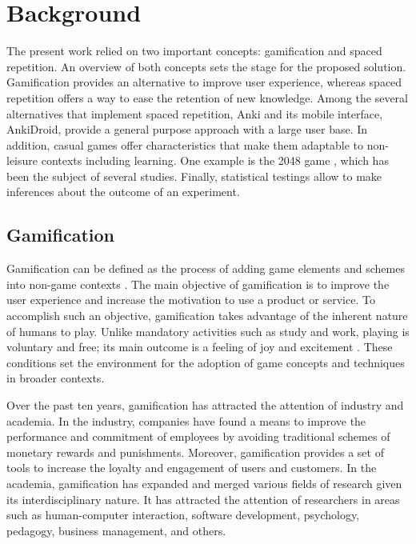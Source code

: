 
\chapter{Background} %

\label{back} %

The present work relied on two important concepts: gamification and spaced repetition. An overview of both concepts sets the stage for the proposed solution. Gamification provides an alternative to improve user experience, whereas spaced repetition offers a way to ease the retention of new knowledge. Among the several alternatives that implement spaced repetition, Anki and its mobile interface, AnkiDroid, provide a general purpose approach with a large user base. In addition, casual games offer characteristics that make them adaptable to non-leisure contexts including learning. One example is the 2048 game \citep{uberspot2017game}, which has been the subject of several studies. Finally, statistical testings allow to make inferences about the outcome of an experiment.

\section{Gamification}
Gamification can be defined as the process of adding game elements and schemes into non-game contexts \citep{deterding2011game}. The main objective of gamification is to improve the user experience and increase the motivation to use a product or service. To accomplish such an objective, gamification takes advantage of the inherent nature of humans to play. Unlike mandatory activities such as study and work, playing is voluntary and free; its main outcome is a feeling of joy and excitement \citep{johan1950homo}. These conditions set the environment for the adoption of game concepts and techniques in broader contexts.

Over the past ten years, gamification has attracted the attention of industry and academia. In the industry, companies have found a means to improve the performance and commitment of employees by avoiding traditional schemes of monetary rewards and punishments. Moreover, gamification provides a set of tools to increase the loyalty and engagement of users and customers. In the academia, gamification has expanded and merged various fields of research given its interdisciplinary nature. It has attracted the attention of researchers in areas such as human-computer interaction, software development, psychology, pedagogy, business management, and others.

